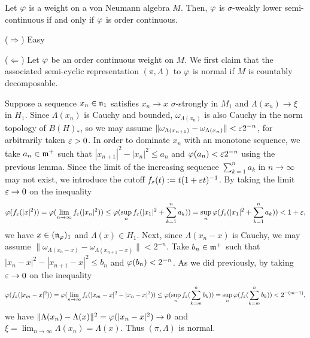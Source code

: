 \documentclass{../../small}
\begin{document}
\begin{thm}
Let $\varphi$ is a weight on a von Neumann algebra $M$.
Then, $\varphi$ is $\sigma$-weakly lower semi-continuous if and only if $\varphi$ is order continuous.
\end{thm}
\begin{pf}
($\Rightarrow$)
Easy

($\Leftarrow$)
Let $\varphi$ be an order continuous weight on $M$.
We first claim that the associated semi-cyclic representation $(\pi,\Lambda)$ to $\varphi$ is normal if $M$ is countably decomposable.

Suppose a sequence $x_n\in\mathfrak{n}_1$ satisfies $x_n\to x$ $\sigma$-strongly in $M_1$ and $\Lambda(x_n)\to\xi$ in $H_1$.
Since $\Lambda(x_n)$ is Cauchy and bounded, $\omega_{\Lambda(x_n)}$ is also Cauchy in the norm topology of $B(H)_*$, so we may assume $\|\omega_{\Lambda(x_{n+1})}-\omega_{\Lambda(x_n)}\|<\varepsilon2^{-n}$, for arbitrarily taken $\varepsilon>0$.
In order to dominate $x_n$ with an monotone sequence, we take $a_n\in\mathfrak{m}^+$ such that $|x_{n+1}|^2-|x_n|^2\le a_n$ and $\varphi(a_n)<\varepsilon2^{-n}$ using the previous lemma.
Since the limit of the increasing sequence $\sum_{k=1}^n a_k$ in $n\to\infty$ may not exist, we introduce the cutoff $f_\varepsilon(t):=t(1+\varepsilon t)^{-1}$.
By taking the limit $\varepsilon\to0$ on the inequality
\[\varphi(f_\varepsilon(|x|^2))=\varphi(\lim_{n\to\infty}f_\varepsilon(|x_n|^2))\le\varphi(\sup_nf_\varepsilon(|x_1|^2+\sum_{k=1}^na_k))=\sup_n\varphi(f_\varepsilon(|x_1|^2+\sum_{k=1}^na_k))<1+\varepsilon,\]
we have $x\in(\mathfrak{n}_\varphi)_1$ and $\Lambda(x)\in H_1$.
Next, since $\Lambda(x_n-x)$ is Cauchy, we may assume $\|\omega_{\Lambda(x_n-x)}-\omega_{\Lambda(x_{n+1}-x)}\|<2^{-n}$.
Take $b_n\in\mathfrak{m}^+$ such that $|x_n-x|^2-|x_{n+1}-x|^2\le b_n$ and $\varphi(b_n)<2^{-n}$.
As we did previously, by taking $\varepsilon\to0$ on the inequality
\[\varphi(f_\varepsilon(|x_m-x|^2))=\varphi(\lim_{n\to\infty}f_\varepsilon(|x_m-x|^2-|x_n-x|^2))\le\varphi(\sup_nf_\varepsilon(\sum_{k=m}^nb_k))=\sup_n\varphi(f_\varepsilon(\sum_{k=m}^nb_k))<2^{-(m-1)},\]
we have $\|\Lambda(x_n)-\Lambda(x)\|^2=\varphi(|x_n-x|^2)\to0$ and $\xi=\lim_{n\to\infty}\Lambda(x_n)=\Lambda(x)$.
Thus $(\pi,\Lambda)$ is normal.



\end{pf}
\end{document}
